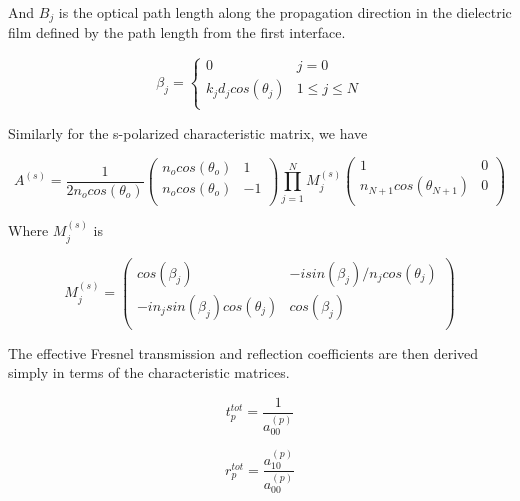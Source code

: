 And $B_{j}$ is the optical path length along the propagation direction in the dielectric film defined by the path length from the first interface.

\begin{equation}
    \beta_{j} = 
    \begin{cases}
        0 & j = 0 \\
        k_{j}d_{j}cos(\theta_{j}) & 1 \leq j \leq N \\
    \end{cases}
\end{equation}

Similarly for the s-polarized characteristic matrix, we have

\begin{equation}
    A^{(s)} = \frac{1}{2n_{o}cos(\theta_{o})}
    \begin{pmatrix}
        n_{o}cos(\theta_{o}) & 1 \\
        n_{o}cos(\theta_{o}) & -1 \\
    \end{pmatrix}
    \prod_{j=1}^{N} M_{j}^{(s)}
    \begin{pmatrix}
        1 & 0 \\
        n_{N+1}cos(\theta_{N+1}) & 0 \\
    \end{pmatrix}
\end{equation}

Where $M_{j}^{(s)}$ is

\begin{equation}
    M_{j}^{(s)} = 
    \begin{pmatrix}
        cos(\beta_{j}) & -isin(\beta_{j})/n_{j}cos(\theta_{j}) \\
        -in_{j}sin(\beta_{j})cos(\theta_{j}) &  cos(\beta_{j})  \\
    \end{pmatrix}
\end{equation}

The effective Fresnel transmission and reflection coefficients are then derived simply in terms of the characteristic matrices.

\begin{equation}
    t_{p}^{tot} = \frac{1}{a_{00}^{(p)}}
\end{equation}

\begin{equation}
    r_{p}^{tot} = \frac{a_{10}^{(p)}}{a_{00}^{(p)}}
\end{equation}

